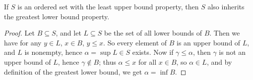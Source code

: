 \begin{theorem}\label{theorem_1.1.2}
  If $S$ is an ordered set with the least upper bound property, then $S$ also
  inherits the greatest lower bound property.
\end{theorem}
\begin{proof}
  Let $B \subseteq S$, and let  $L \subseteq S$ be the set of all lower bounds
  of $B$. Then we have for any $y \in L$, $x \in B$, $y \leq x$. So every
  element of  $B$ is an upper bound of  $L$, and $L$ is nonempty, hence
  $\alpha=\sup{L} \in S$ exists. Now if  $\gamma \leq \alpha$, then $\gamma$ is not
  an upper bound of  $L$, hence  $\gamma \not\in B$; thus  $\alpha \leq x$ for
  all $x \in B$, so  $\alpha \in L$, and by definition of the greatest lower
  bound, we get $\alpha=\inf{B}$.
\end{proof}
